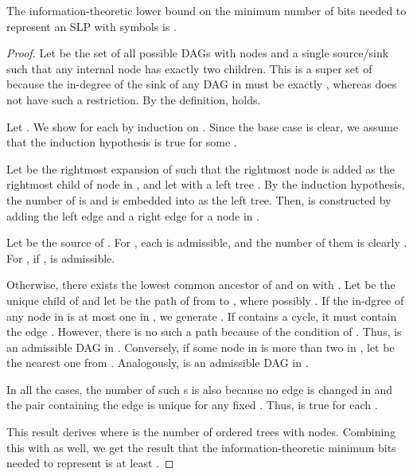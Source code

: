 \documentclass[10pt]{llncs}
\begin{document}
\begin{theorem}\label{th1}
The information-theoretic lower bound on the minimum number of bits needed to
represent an SLP with  symbols is .
\end{theorem}
\begin{proof}
Let  be the set of all possible DAGs with  nodes
and a single source/sink such that any internal node has exactly two children.
This  is a super set of  because
the in-degree of the sink of any DAG in  must be
exactly , whereas  does not have such a restriction.
By the definition, 
 holds.

Let .
We show  for each 
by induction on .
Since the base case  is clear, we assume that the induction hypothesis 
is true for some .

Let  be the rightmost expansion of  such that
the rightmost node  is added as the rightmost child of node  in ,
and let  with a left tree . 
By the induction hypothesis,
the number of  is 
and  is embedded into  as the left tree.
Then,  is constructed by adding the left edge 
and a right edge  for a node  in .

Let  be the source of .
For , each  is admissible,
and the number of them is clearly .
For , if , 
 is admissible.

Otherwise, there exists the lowest common ancestor  of  and 
on  with .
Let  be the unique child of  and let  be the path of  
from  to , where possibly .
If the in-dgree of any node in  is at most one in , 
we generate .
If  contains a cycle, it must contain the edge .
However, there is no such a path because of the condition of .
Thus,  is an admissible DAG in .
Conversely, if some node in  is more than two in , let  be the nearest one from .
Analogously, 
is an admissible DAG in .

In all the cases, the number of such s is also  because 
no edge is changed in  and the pair  
containing the edge  is unique for any fixed .
Thus,  is true for each .

This result derives 
where 
is the number of ordered trees with  nodes.
Combining this with 
 as well,
we get the result that the information-theoretic minimum bits needed to represent
 is at least .
\hspace{\fill}
\end{proof}
\end{document}
